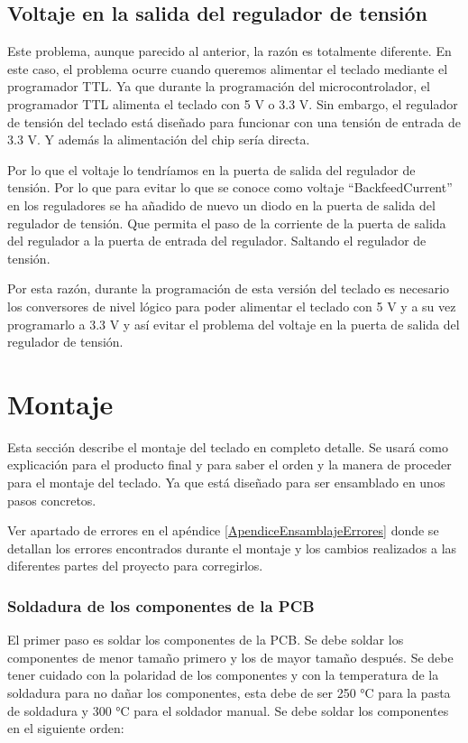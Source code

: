 \subsection{Voltaje en la salida del regulador de tensión} \label{VoltajeRegulador}
Este problema, aunque parecido al anterior, la razón es totalmente diferente. En este caso, el problema ocurre cuando queremos alimentar el teclado mediante el programador \gls{TTL}. Ya que durante la programación del microcontrolador, el programador \gls{TTL} alimenta el teclado con 5 V o 3.3 V. Sin embargo, el regulador de tensión del teclado está diseñado para funcionar con una tensión de entrada de 3.3 V. Y además la alimentación del chip sería directa.

Por lo que el voltaje lo tendríamos en la puerta de salida del regulador de tensión. Por lo que para evitar lo que se conoce como voltaje ``\gls{BackfeedCurrent}'' en los reguladores se ha añadido de nuevo un diodo en la puerta de salida del regulador de tensión. Que permita el paso de la corriente de la puerta de salida del regulador a la puerta de entrada del regulador. Saltando el regulador de tensión.

Por esta razón, durante la programación de esta versión del teclado es necesario los conversores de nivel lógico para poder alimentar el teclado con 5 V y a su vez programarlo a 3.3 V y así evitar el problema del voltaje en la puerta de salida del regulador de tensión.

\newpage
\section{Montaje} \label{MontajeTeclado}
Esta sección describe el montaje del teclado en completo detalle. Se usará como explicación para el producto final y para saber el orden y la manera de proceder para el montaje del teclado. Ya que está diseñado para ser ensamblado en unos pasos concretos.

\begin{tcolorbox}[colback=red!11!white, colframe=red!50!white, title=Errores]
    Ver apartado de errores en el apéndice \ref{ApendiceEnsamblajeErrores} donde se detallan los errores encontrados durante el montaje y los cambios realizados a las diferentes partes del proyecto para corregirlos.
\end{tcolorbox}

\subsubsection{Soldadura de los componentes de la \gls{PCB}}
El primer paso es soldar los componentes de la \gls{PCB}. Se debe soldar los componentes de menor tamaño primero y los de mayor tamaño después. Se debe tener cuidado con la polaridad de los componentes y con la temperatura de la soldadura para no dañar los componentes, esta debe de ser 250 °C para la pasta de soldadura y 300 °C para el soldador manual. Se debe soldar los componentes en el siguiente orden:

